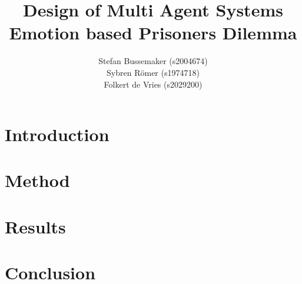 \documentclass[a4paper]{article}
\title{Design of Multi Agent Systems\\
Emotion based Prisoners Dilemma}
\author{Stefan Bussemaker (s2004674)\\Sybren R\"omer (s1974718)\\Folkert de Vries (s2029200)}
\begin{document}
\maketitle

\section*{Introduction}

\section*{Method}

\section*{Results}

\section*{Conclusion}

\printbibliography
\end{document}
